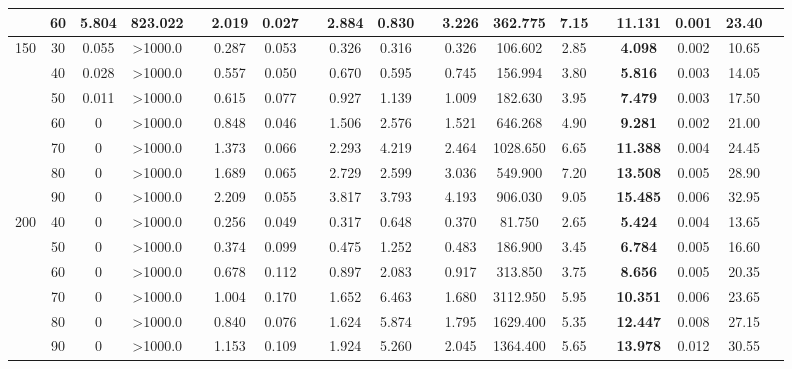 \documentclass[algorithms,article,accept,moreauthors,pdftex]{Definitions/mdpi}
\begin{document}
\begin{specialtable}
\begin{footnotesize}
\begin{tabular}{ccccccccccccccccccc}
     & 60   & 5.804   & 823.022 &&  2.019  &  0.027  & &  2.884  &  0.830   & &  3.226  &  362.775  & 7.15  & & {\bf 11.131} & 0.001  & 23.40 \\  \midrule
 150 & 30   & 0.055   & >1000.0 &&  0.287  &  0.053  & &  0.326  &  0.316   & &  0.326  &  106.602  & 2.85  & & {\bf 4.098}  &  0.002 & 10.65 \\
     & 40   & 0.028   & >1000.0 &&  0.557  &  0.050  & &  0.670  &  0.595   & &  0.745  &  156.994  & 3.80  & & {\bf 5.816}  &  0.003 & 14.05 \\
     & 50   & 0.011   & >1000.0 &&  0.615  &  0.077  & &  0.927  &  1.139   & &  1.009  &  182.630  & 3.95  & & {\bf 7.479}  &  0.003 & 17.50 \\
     & 60   & 0       & >1000.0 &&  0.848  &  0.046  & &  1.506  &  2.576   & &  1.521  &  646.268  & 4.90  & & {\bf 9.281}  &  0.002 & 21.00 \\
     & 70   & 0       & >1000.0 &&  1.373  &  0.066  & &  2.293  &  4.219   & &  2.464  &  1028.650 & 6.65  & & {\bf 11.388} & 0.004  & 24.45 \\
     & 80   & 0       & >1000.0 &&  1.689  &  0.065  & &  2.729  &  2.599   & &  3.036  &  549.900  & 7.20  & & {\bf 13.508} & 0.005  & 28.90 \\
     & 90   & 0       & >1000.0 &&  2.209  &  0.055  & &  3.817  &  3.793   & &  4.193  &  906.030  & 9.05  & & {\bf 15.485} & 0.006  & 32.95 \\ \midrule
 200 & 40   & 0       & >1000.0 &&  0.256  &  0.049  & &  0.317  &  0.648   & &  0.370  &  81.750   & 2.65  & & {\bf 5.424}  &  0.004 & 13.65 \\
     & 50   & 0       & >1000.0 &&  0.374  &  0.099  & &  0.475  &  1.252   & &  0.483  &  186.900  & 3.45  & & {\bf 6.784}  &  0.005 & 16.60 \\
     & 60   & 0       & >1000.0 &&  0.678  &  0.112  & &  0.897  &  2.083   & &  0.917  &  313.850  & 3.75  & & {\bf 8.656}  &  0.005 & 20.35 \\
     & 70   & 0       & >1000.0 &&  1.004  &  0.170  & &  1.652  &  6.463   & &  1.680  &  3112.950 & 5.95  & & {\bf 10.351} & 0.006  & 23.65 \\
     & 80   & 0       & >1000.0 &&  0.840  &  0.076  & &  1.624  &  5.874   & &  1.795  &  1629.400 & 5.35  & & {\bf 12.447} & 0.008  & 27.15 \\
     & 90   & 0       & >1000.0 &&  1.153  &  0.109  & &  1.924  &  5.260   & &  2.045  &  1364.400 & 5.65  & & {\bf 13.978} & 0.012  & 30.55 \\

\end{tabular}
\end{footnotesize}
\end{specialtable}
\end{document}
